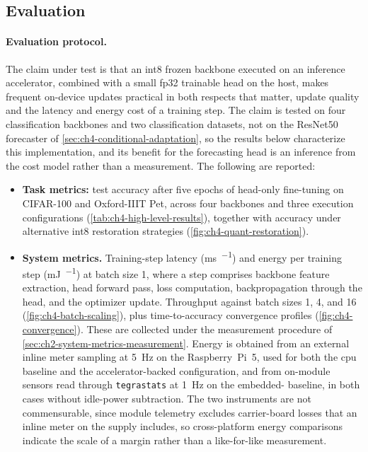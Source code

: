 \subsection{Evaluation}
\label{sec:ch4-heterogeneous-evaluation}

\paragraph{Evaluation protocol.} The claim under test is that an \gls{int8} frozen backbone executed on an inference accelerator, combined with a small \gls{fp32} trainable head on the host, makes frequent on-device updates practical in both respects that matter, update quality and the latency and energy cost of a training step. The claim is tested on four classification backbones and two classification datasets, not on the ResNet50 forecaster of \cref{sec:ch4-conditional-adaptation}, so the results below characterize this implementation, and its benefit for the forecasting head is an inference from the cost model rather than a measurement. The following are reported:
\begin{itemize}
  \item \textbf{Task metrics:} test accuracy after five epochs of head-only fine-tuning on CIFAR-100 and Oxford-IIIT Pet, across four backbones and three execution configurations (\cref{tab:ch4-high-level-results}), together with accuracy under alternative \gls{int8} restoration strategies (\cref{fig:ch4-quant-restoration}).
  \item \textbf{System metrics.} Training-step latency (\si{\milli\second\per\step}) and energy per training step (\si{\milli\joule\per\step}) at batch size 1, where a step comprises backbone feature extraction, head forward pass, loss computation, backpropagation through the head, and the optimizer update. Throughput against batch sizes 1, 4, and 16 (\cref{fig:ch4-batch-scaling}), plus time-to-accuracy convergence profiles (\cref{fig:ch4-convergence}). These are collected under the measurement procedure of \cref{sec:ch2-system-metrics-measurement}. Energy is obtained from an external inline meter sampling at \SI{5}{\hertz} on the Raspberry~Pi~5, used for both the \gls{cpu} baseline and the accelerator-backed configuration, and from on-module sensors read through \texttt{tegrastats} at \SI{1}{\hertz} on the embedded- baseline, in both cases without idle-power subtraction. The two instruments are not commensurable, since module telemetry excludes carrier-board losses that an inline meter on the supply includes, so cross-platform energy comparisons indicate the scale of a margin rather than a like-for-like measurement.
\end{itemize}


